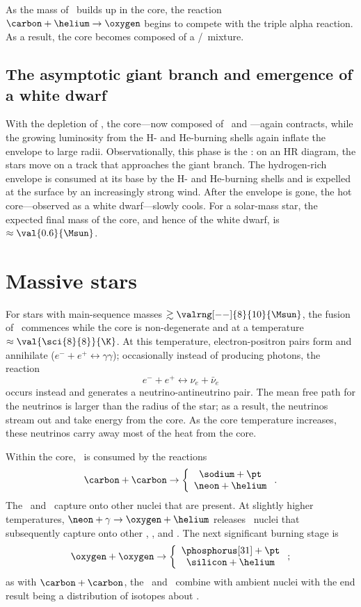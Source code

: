As the mass of \carbon\ builds up in the core, the reaction $\carbon+\helium\to\oxygen$ begins to compete with the triple alpha reaction. As a result, the core becomes composed of a \carbon/\oxygen\ mixture.

\subsection{The asymptotic giant branch and emergence of a white dwarf}

With the depletion of \helium, the core---now composed of \carbon\ and \oxygen---again contracts, while the growing luminosity from the H- and He-burning shells again inflate the envelope to large radii. Observationally, this phase is the : on an HR diagram, the stars move on a track that approaches the giant branch. The hydrogen-rich envelope is consumed at its base by the H- and He-burning shells and is expelled at the surface by an increasingly strong wind. After the envelope is gone, the hot core---observed as a white dwarf---slowly cools. For a solar-mass star, the expected final mass of the core, and hence of the white dwarf, is $\approx\val{0.6}{\Msun}$.

\section{Massive stars}

For stars with main-sequence masses $\gtrsim \valrng[--]{8}{10}{\Msun}$, the fusion of \carbon\ commences while the core is non-degenerate and at a temperature $\approx\val{\sci{8}{8}}{\K}$.  At this temperature, electron-positron pairs form and annihilate ($e^{-}+e^{+}\longleftrightarrow\gamma\gamma$); occasionally instead of producing photons, the reaction
\[ e^{-}+e^{+} \longleftrightarrow \nu_{e} + \bar{\nu}_{e}\]
occurs instead and generates a neutrino-antineutrino pair. The mean free path for the neutrinos is larger than the radius of the star; as a result, the neutrinos stream out and take energy from the core. As the core temperature increases, these neutrinos carry away most of the heat from the core.

Within the core, \carbon\ is consumed by the reactions
\[ \carbon+\carbon\to\left\{\begin{array}{c}\sodium+\pt \\\neon+\helium\end{array}\right.. \]
The \pt\ and \helium\ capture onto other nuclei that are present.  At slightly higher temperatures, $\neon+\gamma \to \oxygen+\helium$ releases \helium\ nuclei that subsequently capture onto other \oxygen, \neon, and \magnesium. The next significant burning stage is
\[\oxygen+\oxygen\to\left\{\begin{array}{c}\phosphorus[31]+\pt \\ \silicon+\helium \end{array}\right. ;\]
as with $\carbon+\carbon$, the \pt\ and \helium\ combine with ambient nuclei with the end result being a distribution of isotopes about \silicon.

